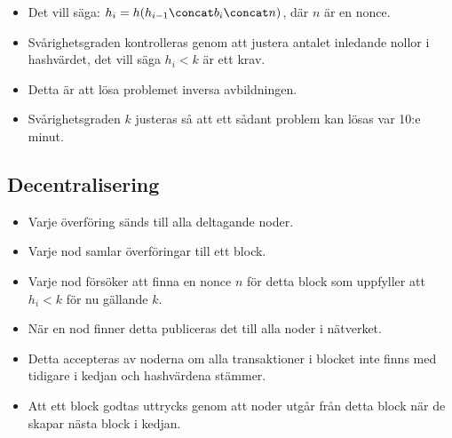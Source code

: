 \documentclass{beamer}
\begin{document}
\begin{frame}{\insertsubsectionhead}
  \begin{itemize}
    \item Det vill säga: \(h_i = h(h_{i-1}\concat b_i\concat n)\), där \(n\) är 
      en nonce.
    \item Svårighetsgraden kontrolleras genom att justera antalet inledande 
      nollor i hashvärdet, det vill säga \(h_i < k\) är ett krav.
    \item Detta är att lösa problemet inversa avbildningen.
    \item Svårighetsgraden \(k\) justeras så att ett sådant problem kan lösas 
      var 10:e minut.
  \end{itemize}
\end{frame}


\subsection{Decentralisering}

\begin{frame}{\insertsubsectionhead}
  \begin{itemize}
    \item Varje överföring sänds till alla deltagande noder.
    \item Varje nod samlar överföringar till ett block.
    \item Varje nod försöker att finna en nonce \(n\) för detta block som 
      uppfyller att \(h_i < k\) för nu gällande \(k\).
    \item När en nod finner detta publiceras det till alla noder i nätverket.
    \item Detta accepteras av noderna om alla transaktioner i blocket inte 
      finns med tidigare i kedjan och hashvärdena stämmer.
    \item Att ett block godtas uttrycks genom att noder utgår från detta block 
      när de skapar nästa block i kedjan.
  \end{itemize}
\end{frame}
\end{document}
